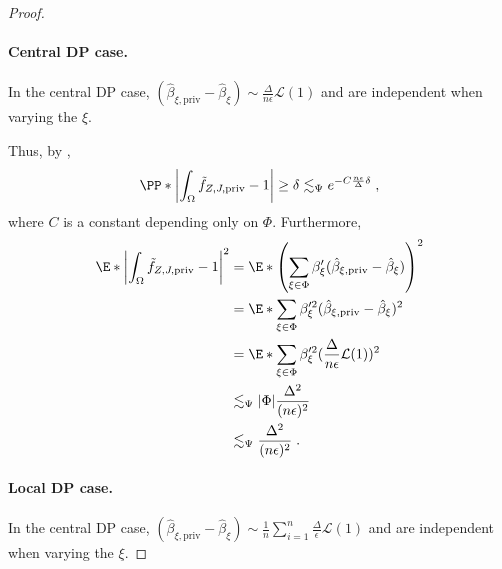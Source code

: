 \documentclass{article}
\newcommand{\1}{\mathds{1}}
\DeclarePairedDelimiter{\abs}{\lvert}{\rvert}
\DeclarePairedDelimiter{\paren}{\lparen}{\rparen}
\theoremstyle{plain}
\theoremstyle{definition}
\theoremstyle{remark}
\begin{document}
\begin{proof}
\paragraph{Central DP case.}

In the central DP case, $(\hat{\beta}_{\xi, \textrm{priv}} - \hat{\beta}_{\xi}) \sim  \frac{\Delta}{n \epsilon} \mathcal{L}(1)$ and are independent when varying the $\xi$. 

Thus, by ,
\begin{equation}
        \begin{aligned}
            \PP*{\abs*{\int_{\Omega} \tilde{f}_{Z, J, \textrm{priv} } - 1} \geq \delta} \lesssim_{\Psi} e^{- C \frac{n \epsilon}{\Delta} \delta} \;,
        \end{aligned}
    \end{equation}
    where $C$ is a constant depending only on $\Phi$.
Furthermore, 
\begin{equation}
    \begin{aligned}
        \E*{\abs*{\int_{\Omega} \tilde{f}_{Z, J, \textrm{priv} } - 1}^2} 
        &=
        \E*{\paren*{\sum_{\xi \in \Phi} \beta_{\xi}' (\hat{\beta}_{\xi, \textrm{priv}} - \hat{\beta}_{\xi})}^2} \\
        &=
        \E*{\sum_{\xi \in \Phi} \beta_{\xi}'^2 (\hat{\beta}_{\xi, \textrm{priv}} - \hat{\beta}_{\xi})^2}  \\
        &=
        \E*{\sum_{\xi \in \Phi} \beta_{\xi}'^2 (\frac{\Delta}{n \epsilon} \mathcal{L} (1))^2}  \\
        &\lesssim_{\Psi} | \Phi| \frac{\Delta^2}{(n \epsilon)^2} \\
        &\lesssim_{\Psi} \frac{\Delta^2}{(n \epsilon)^2} \;.
    \end{aligned}
\end{equation}

\paragraph{Local DP case.} 
In the central DP case, $(\hat{\beta}_{\xi, \textrm{priv}} - \hat{\beta}_{\xi}) \sim \frac{1}{n} \sum_{i=1}^n  \frac{\Delta}{\epsilon} \mathcal{L}(1)$ and are independent when varying the $\xi$.


\end{proof}
\end{document}
